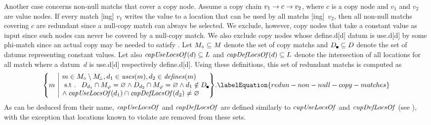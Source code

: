 Another case concerns non-\glspl{null match} that cover a \gls{copy node}.
%
Assume a copy chain \mbox{$v_1 \rightarrow c \rightarrow v_2$}, where $c$ is a
\gls{copy node} and $v_1$ and $v_2$ are \glspl{value node}.
%
If every \gls{match} [ing] $v_1$ writes the value to a
\gls{location} that can be used by all \glspl{match}
[ing]~$v_2$, then all non-\glspl{null match} covering $c$ are
redundant since a \gls{null-copy match} can always be selected.
%
We exclude, however, \glspl{copy node} that take a constant value as input since
such \glspl{node} can never be covered by a \gls{null-copy match}.
%
We also exclude \glspl{copy node} whose \gls{define.d}[d] \gls{datum} is
\gls{use.d}[d] by some \gls{phi-match} since an actual copy may be needed to
satisfy .
%
Let \mbox{$\mCopyMatchSet \subseteq \mMatchSet$} denote the set of \glspl{copy
  match} and \mbox{$\mConstDataSet \subseteq \mDataSet$} denote the set of
\glspl{datum} representing constant values.
%
Let also \mbox{$\operatorname{\textrm{\textit{capUseLocsOf}}}(d) \subseteq L$} and
\mbox{$\operatorname{\textrm{\textit{capDefLocsOf}}}(d) \subseteq L$} denote the intersection of
all \glspl{location} for all \gls{match} where a \gls{datum}~$d$ is
\gls{use.d}[d] respectively \gls{define.d}[d].
%
Using these definitions, this set of redundant \glspl{match} is computed as
%
\begin{equation}
  \mSetBuilder*{m}%
               {%
                 \begin{array}{@{}l@{}}
                   m \in \mCopyMatchSet \setminus \mNullMatchSet,
                   d_1 \in \mUses(m),
                   d_2 \in \mDefines(m) \\
                   \text{\st }
                   \mDataSet[d_1] \cap \mPhiMatchSet = \mEmptySet
                   \mAnd
                   \mDataSet[d_2] \cap \mPhiMatchSet = \mEmptySet
                   \mAnd
                   d_1 \notin \mConstDataSet \\
                   \mbox{}\hspace{-2pt} \mAnd
                   \mCapUseLocsOf(d_1) \cap \mCapDefLocsOf(d_2) \neq \mEmptySet
                 \end{array}
               }\!.
  \labelEquation{redun-non-null-copy-matches}
\end{equation}
%
As can be deduced from their name, $\operatorname{\textrm{\textit{capUseLocsOf}}}$ and $\operatorname{\textrm{\textit{capDefLocsOf}}}$ are
defined similarly to $\operatorname{\textrm{\textit{cupUseLocsOf}}}$ and $\operatorname{\textrm{\textit{cupDefLocsOf}}}$ (see
), with the
exception that \glspl{location} known to violate
 are removed from these sets.


